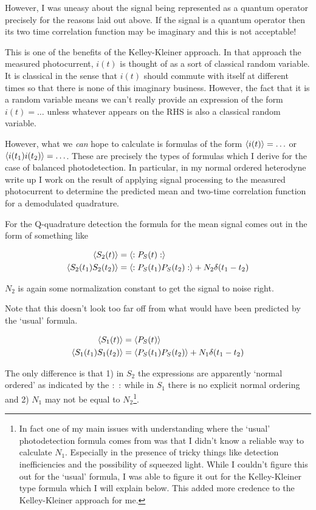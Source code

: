 \documentclass[12pt]{article}
\begin{document}
However, I was uneasy about the signal being represented as a quantum operator precisely for the reasons laid out above. If the signal is a quantum operator then its two time correlation function may be imaginary and this is not acceptable!

This is one of the benefits of the Kelley-Kleiner approach. In that approach the measured photocurrent, $i(t)$ is thought of as a sort of classical random variable. It is classical in the sense that $i(t)$ should commute with itself at different times so that there is none of this imaginary business. However, the fact that it is a random variable means we can't really provide an expression of the form $i(t) = \ldots$ unless whatever appears on the RHS is also a classical random variable.

However, what we \textit{can} hope to calculate is formulas of the form $\Braket{i(t)} = \ldots$ or $\Braket{i(t_1)i(t_2)} = \ldots$. These are precisely the types of formulas which I derive for the case of balanced photodetection. In particular, in my normal ordered heterodyne write up I work on the result of applying signal processing to the measured photocurrent to determine the predicted mean and two-time correlation function for a demodulated quadrature.

For the Q-quadrature detection the formula for the mean signal comes out in the form of something like

\begin{align}
\Braket{S_2(t)} &= \Braket{:P_S(t):}\\
\Braket{S_2(t_1)S_2(t_2)} &= \Braket{:P_S(t_1)P_S(t_2):} + N_2 \delta(t_1 -t_2)
\end{align}

$N_2$ is again some normalization constant to get the signal to noise right.

Note that this doesn't look too far off from what would have been predicted by the `usual' formula.

\begin{align}
\Braket{S_1(t)} &= \Braket{P_S(t)}\\
\Braket{S_1(t_1)S_1(t_2)} &= \Braket{P_S(t_1)P_S(t_2)} + N_1 \delta(t_1 -t_2)
\end{align}

The only difference is that 1) in $S_2$ the expressions are apparently `normal ordered' as indicated by the $:\hspace{5 pt}:$ while in $S_1$ there is no explicit normal ordering and 2) $N_1$ may not be equal to $N_2$\footnote{In fact one of my main issues with understanding where the `usual' photodetection formula comes from was that I didn't know a reliable way to calculate $N_1$. Especially in the presence of tricky things like detection inefficiencies and the possibility of squeezed light. While I couldn't figure this out for the `usual' formula, I was able to figure it out for the Kelley-Kleiner type formula which I will explain below. This added more credence to the Kelley-Kleiner approach for me.}.
\end{document}

